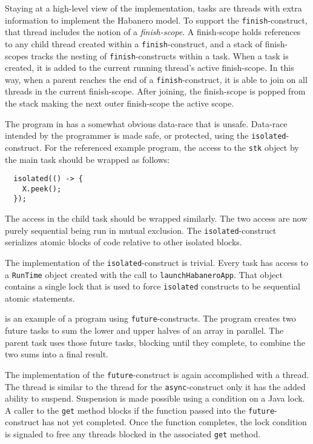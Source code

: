 Staying at a high-level view of the implementation, tasks are threads
with extra information to implement the Habanero model. To support the
\texttt{finish}-construct, that thread includes the notion of a
\emph{finish-scope}. A finish-scope holds references to any child
thread created within a \texttt{finish}-construct, and a stack of
finish-scopes tracks the nesting of \texttt{finish}-constructs within
a task. When a task is created, it is added to the current running
thread's active finish-scope. In this way, when a parent reaches the
end of a \texttt{finish}-construct, it is able to join on all threads
in the current finish-scope. After joining, the finish-scope is popped
from the stack making the next outer finish-scope the active scope.

The program in  has a somewhat
obvious data-race that is unsafe. Data-race intended by the programmer
is made safe, or protected, using the \texttt{isolated}-construct. For the referenced example program, the access to the \texttt{stk} object by the main task should be wrapped as follows:
\begin{lstlisting}
  isolated(() -> {
    X.peek();
  });
\end{lstlisting}
The access in the child task should be wrapped similarly. The two
access are now purely sequential being run in mutual exclusion. The
\texttt{isolated}-construct serializes atomic blocks of code relative
to other isolated blocks.

The implementation of the \texttt{isolated}-construct is
trivial. Every task has access to a \texttt{RunTime} object created
with the call to \texttt{launchHabaneroApp}. That object contains a
single lock that is used to force \texttt{isolated} constructs to be
sequential atomic statements. 

 is an example of a program using
\texttt{future}-constructs. The program creates two future tasks to
sum the lower and upper halves of an array in parallel. The parent
task uses those future tasks, blocking until they complete, to combine
the two sums into a final result.

The implementation of the \texttt{future}-construct is again accomplished with
a thread. The thread is similar to the thread for the
\texttt{async}-construct only it has the added ability to
suspend. Suspension is made possible using a condition on a Java
lock. A caller to the \texttt{get} method blocks if the function
passed into the \texttt{future}-construct has not yet completed. Once
the function completes, the lock condition is signaled to free any threads blocked
in the associated \texttt{get} method.

